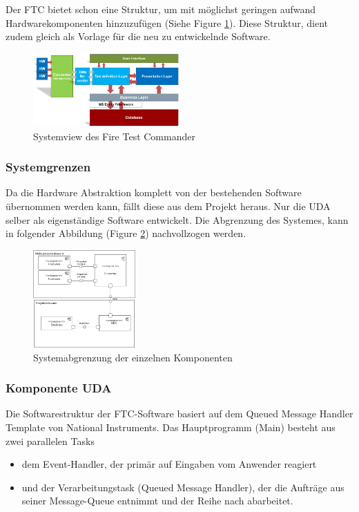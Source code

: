 \documentclass[10pt]{scrartcl}
\begin{document}
Der FTC bietet schon eine Struktur, um mit möglichst geringen aufwand Hardwarekomponenten hinzuzufügen (Siehe Figure \ref{fig:SystemViewFTC}). Diese Struktur, dient zudem gleich als Vorlage für die neu zu entwickelnde Software.
\begin{figure}[htbp] 
	\centering
	\includegraphics[width=0.5\textwidth]{SystemviewFTC}
	\caption{Systemview des Fire Test Commander}
	\label{fig:SystemViewFTC}
\end{figure}

\subsubsection{Systemgrenzen}
Da die Hardware Abstraktion komplett von der bestehenden Software übernommen werden kann, fällt diese aus dem Projekt heraus. Nur die UDA selber als eigenständige Software entwickelt. Die Abgrenzung des Systemes, kann in folgender Abbildung (Figure \ref{fig:SystemView}) nachvollzogen werden.
\begin{figure}[htbp] 
	\centering
	\includegraphics[width=0.35\textwidth]{Systemgrenzen}
	\caption{Systemabgrenzung der einzelnen Komponenten}
	\label{fig:SystemView}
\end{figure}

\subsubsection{Komponente UDA}
Die Softwarestruktur der FTC-Software basiert auf dem Queued Message Handler Template von National Instruments. Das Hauptprogramm (Main) besteht aus zwei parallelen Tasks
\begin{itemize}
	\item dem Event-Handler, der primär auf Eingaben vom Anwender reagiert
	\item und der Verarbeitungstask (Queued Message Handler), der die Aufträge aus seiner Message-Queue entnimmt und der Reihe nach abarbeitet.
\end{itemize}
\end{document}
